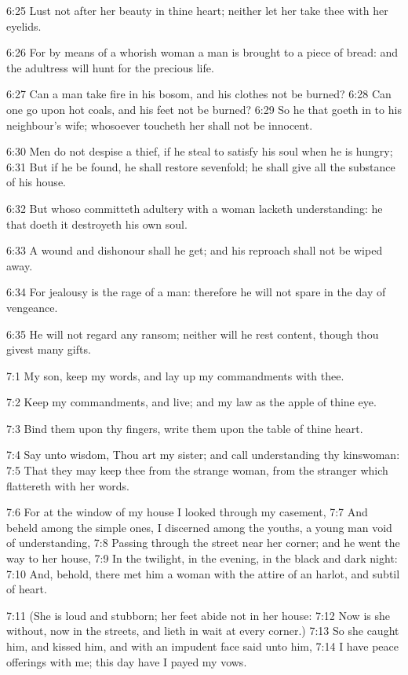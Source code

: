 6:25 Lust not after her beauty in thine heart; neither let her take
thee with her eyelids.

6:26 For by means of a whorish woman a man is brought to a piece of
bread: and the adultress will hunt for the precious life.

6:27 Can a man take fire in his bosom, and his clothes not be burned?
6:28 Can one go upon hot coals, and his feet not be burned?  6:29 So
he that goeth in to his neighbour's wife; whosoever toucheth her shall
not be innocent.

6:30 Men do not despise a thief, if he steal to satisfy his soul when
he is hungry; 6:31 But if he be found, he shall restore sevenfold; he
shall give all the substance of his house.

6:32 But whoso committeth adultery with a woman lacketh understanding:
he that doeth it destroyeth his own soul.

6:33 A wound and dishonour shall he get; and his reproach shall not be
wiped away.

6:34 For jealousy is the rage of a man: therefore he will not spare in
the day of vengeance.

6:35 He will not regard any ransom; neither will he rest content,
though thou givest many gifts.

7:1 My son, keep my words, and lay up my commandments with thee.

7:2 Keep my commandments, and live; and my law as the apple of thine
eye.

7:3 Bind them upon thy fingers, write them upon the table of thine
heart.

7:4 Say unto wisdom, Thou art my sister; and call understanding thy
kinswoman: 7:5 That they may keep thee from the strange woman, from
the stranger which flattereth with her words.

7:6 For at the window of my house I looked through my casement, 7:7
And beheld among the simple ones, I discerned among the youths, a
young man void of understanding, 7:8 Passing through the street near
her corner; and he went the way to her house, 7:9 In the twilight, in
the evening, in the black and dark night: 7:10 And, behold, there met
him a woman with the attire of an harlot, and subtil of heart.

7:11 (She is loud and stubborn; her feet abide not in her house: 7:12
Now is she without, now in the streets, and lieth in wait at every
corner.)  7:13 So she caught him, and kissed him, and with an impudent
face said unto him, 7:14 I have peace offerings with me; this day have
I payed my vows.

